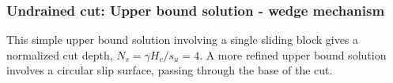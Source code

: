 \documentclass[notes]{beamer}
\begin{document}
\begin{frame}
	\frametitle{Undrained cut: Upper bound solution - wedge mechanism}
This simple upper bound solution involving a single sliding block gives a
normalized cut depth, $N_s = \gamma H_c /s_u = 4$. A more refined upper bound solution
involves a circular slip surface, passing through the base of the cut.
	
\end{frame}
\end{document}
